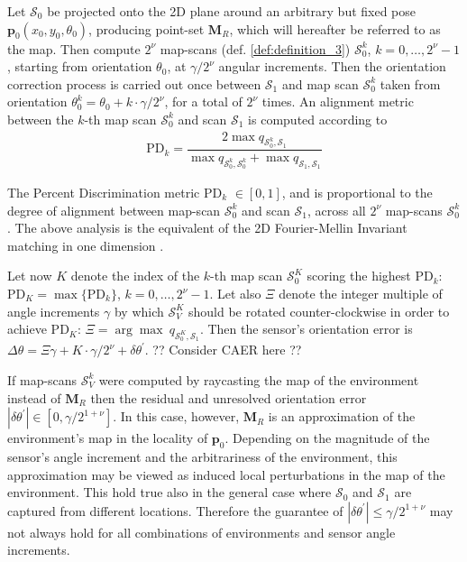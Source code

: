 Let $\mathcal{S}_0$ be projected onto the 2D plane around an arbitrary but
fixed pose $\bm{p}_0(x_0, y_0, \theta_0)$, producing point-set $\bm{M}_R$, which
will hereafter be referred to as the map. Then compute $2^\nu$ map-scans (def.
\ref{def:definition_3}) $\mathcal{S}_0^k$, $k = 0,\dots,2^\nu-1$, starting from
orientation $\theta_0$, at $\gamma / 2^\nu$ angular increments. Then the
orientation correction process is carried out once between $\mathcal{S}_1$ and
map scan $\mathcal{S}_0^k$ taken from orientation $\theta_0^k = \theta_0 +
k \cdot \gamma / 2^\nu$, for a total of $2^\nu$ times. An alignment metric
between the $k$-th map scan $\mathcal{S}_0^k$ and scan $\mathcal{S}_1$ is
computed according to
\begin{align}
  \text{PD}_k = \dfrac{2 \max q_{\mathcal{S}_0^k,\mathcal{S}_1}}{\max q_{\mathcal{S}_0^k,\mathcal{S}_0^k} + \max q_{\mathcal{S}_1,\mathcal{S}_1}}
  \label{eq:pd}
\end{align}

The Percent Discrimination metric PD$_k$ $\in [0,1]$, and is proportional to
the degree of alignment between map-scan $\mathcal{S}_0^k$ and
scan $\mathcal{S}_1$, across all $2^\nu$ map-scans $\mathcal{S}_0^k$.
The above analysis is the equivalent of the 2D Fourier-Mellin Invariant
matching in one dimension \cite{fmt2d}.

Let now $K$ denote the index of the $k$-th map scan
$\mathcal{S}_0^K$ scoring the highest PD$_k$: $\text{PD}_K =
\max \{\text{PD}_k\}$, $k = 0,\dots,2^\nu-1$. Let also $\Xi$ denote the integer
multiple of angle increments $\gamma$ by which $\mathcal{S}_V^K$
should be rotated counter-clockwise in order to achieve PD$_K$:
$\Xi = \arg\max\ q_{\mathcal{S}_0^K, \mathcal{S}_1}$.  Then the sensor's
orientation error is
$\Delta\theta = \Xi\gamma + K \cdot \gamma/2^\nu + \delta\theta^\prime$.
?? Consider CAER here ??

If map-scans $\mathcal{S}_V^k$ were computed by raycasting the map of the
environment instead of $\bm{M}_R$ then the residual and unresolved orientation
error $|\delta\theta^\prime| \in [0,\gamma / 2^{1+\nu}]$. In this case, however,
$\bm{M}_R$ is an approximation of the environment's map in the locality of
$\bm{p}_0$. Depending on the magnitude of the sensor's angle increment and
the arbitrariness of the environment, this approximation may be viewed as
induced local perturbations in the map of the environment. This hold true also
in the general case where $\mathcal{S}_0$ and $\mathcal{S}_1$ are captured
from different locations. Therefore the guarantee of $|\delta\theta^\prime|
\leq \gamma / 2^{1+\nu}$ may not always hold for all combinations of
environments and sensor angle increments.

